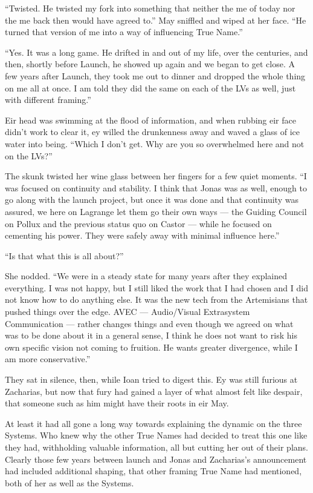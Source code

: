 ``Twisted. He twisted my fork into something that neither the me of today nor the me back then would have agreed to.'' May sniffled and wiped at her face. ``He turned that version of me into a way of influencing True Name.''

``Yes. It was a long game. He drifted in and out of my life, over the centuries, and then, shortly before Launch, he showed up again and we began to get close. A few years after Launch, they took me out to dinner and dropped the whole thing on me all at once. I am told they did the same on each of the LVs as well, just with different framing.''

Eir head was swimming at the flood of information, and when rubbing eir face didn't work to clear it, ey willed the drunkenness away and waved a glass of ice water into being. ``Which I don't get. Why are you so overwhelmed here and not on the LVs?''

The skunk twisted her wine glass between her fingers for a few quiet moments. ``I was focused on continuity and stability. I think that Jonas was as well, enough to go along with the launch project, but once it was done and that continuity was assured, we here on Lagrange let them go their own ways — the Guiding Council on Pollux and the previous status quo on Castor — while he focused on cementing his power. They were safely away with minimal influence here.''

``Is that what this is all about?''

She nodded. ``We were in a steady state for many years after they explained everything. I was not happy, but I still liked the work that I had chosen and I did not know how to do anything else. It was the new tech from the Artemisians that pushed things over the edge. AVEC — Audio/Visual Extrasystem Communication — rather changes things and even though we agreed on what was to be done about it in a general sense, I think he does not want to risk his own specific vision not coming to fruition. He wants greater divergence, while I am more conservative.''

They sat in silence, then, while Ioan tried to digest this. Ey was still furious at Zacharias, but now that fury had gained a layer of what almost felt like despair, that someone such as him might have their roots in eir May.

At least it had all gone a long way towards explaining the dynamic on the three Systems. Who knew why the other True Names had decided to treat this one like they had, withholding valuable information, all but cutting her out of their plans. Clearly those few years between launch and Jonas and Zacharias's announcement had included additional shaping, that other framing True Name had mentioned, both of her as well as the Systems.

